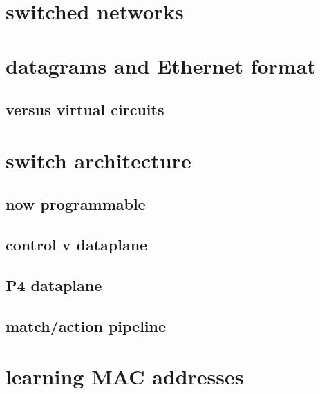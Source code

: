 \date{}
\title{}
\date{}

\begin{frame}
    \titlepage
\end{frame}

\section{switched networks}



\section{datagrams and Ethernet format}



\subsection{versus virtual circuits}



\section{switch architecture}

\subsection{now programmable}


\subsection{control v dataplane}


\subsection{P4 dataplane}


\subsection{match/action pipeline}

\section{learning MAC addresses}

